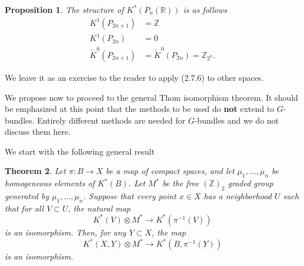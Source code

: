 \documentclass[leqno]{book}
\numberwithin{equation}{section}
\newtheorem{theorem}{Theorem}[section]%
\newtheorem{proposition}[theorem]{Proposition}
\theoremstyle{definition}
\renewcommand{\emph}{\textbf}
\begin{document}
            \begin{proposition}
              The structure of $K^{*}(P_{n}(\mathbb{R}))$ is as follows
              \begin{equation*}
                \begin{aligned}
                K^{1}(P_{2n+1}) &= \mathbb{Z} \\
                K^{1}(P_{2n}) &=0 \\
                \tilde{K}^{0}(P_{2n+1}) &= \tilde{K}^{0}(P_{2n})=\mathbb{Z}_{2^{n}}.
                \end{aligned}
              \end{equation*}
            \end{proposition}
            
            \noindent We leave it as an exercise to the reader to apply (2.7.6) to other spaces.

            We propose now to proceed to the general Thom isomorphism theorem. It should be emphasized at this point that the methods to be used do \emph{not} extend to $G$-bundles. Entirely different methods are needed for $G$-bundles and we do not discuss them here.

            We start with the following general result

            \begin{theorem}
              Let $\pi:B\to X$ be a map of compact spaces, and let $\mu_1, \ldots ,\mu_{n}$ be homogeneous elements of $K^{*}(B)$. Let $M^{*}$ be the free $(\mathbb{Z})_{2}$ graded group generated by $\mu_1, \ldots ,\mu_{n}$. Suppose that every point $x\in X$ has a neighborhood $U$ such that for all $V \subset U$, the natural map
              \begin{equation*}
                K^{*}(V)\otimes M^{*} \to K^{*}(\pi^{-1}(V))
              \end{equation*}
              is an isomorphism. Then, for any $Y \subset X$, the map 
              \begin{equation*}
                K^{*}(X,Y)\otimes M^{*}\to K^{*}(B,\pi^{-1}(Y))
              \end{equation*}
              is an isomorphism.
            \end{theorem}
\end{document}
